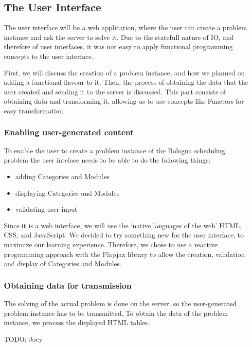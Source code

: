 \documentclass[a4paper]{article}
\begin{document}
\subsection{The User Interface}
\label{sec:design-ui}
The user interface will be a web application, 
where the user can create a problem instance and ask the server to solve it.
Due to the statefull nature of IO, and therefore of user interfaces,
it was not easy to apply functional programming concepts to the user interface.

First, we will discuss the creation of a problem instance, 
and how we planned on adding a functional flavour to it.
Then, the process of obtaining the data that the user created and sending
it to the server is discussed.
This part consists of obtaining data and transforming it, 
allowing us to use concepts like Functors for easy transformation.

\subsubsection{Enabling user-generated content}
To enable the user to create a problem instance of the Bologna scheduling problem
the user inteface needs to be able to do the following things:
\begin{itemize}
	\item adding Categories and Modules
	\item displaying Categories and Modules
	\item validating user input
\end{itemize}
Since it is a web interface, we will use the `native languages of the web' HTML, CSS,
and JavaScript.
We decided to try something new for the user interface, 
to maximize our learning experience.
Therefore, we chose to use a reactive programming approach with the Flapjax library \cite{flapjax} to allow the creation, validation and display of Categories and Modules.

\subsubsection{Obtaining data for transmission}
The solving of the actual problem is done on the server, 
so the user-generated problem instance has to be transmitted.
To obtain the data of the problem instance, 
we process the displayed HTML tables.

{\Large TODO:} Joey

\end{document}
